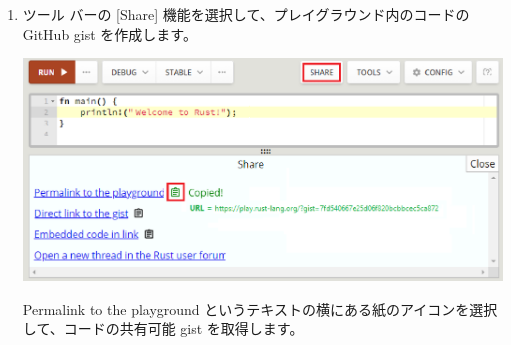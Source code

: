 \begin{enumerate}
\item ツール バーの [Share] 機能を選択して、プレイグラウンド内のコードの GitHub gist を作成します。

\includegraphics[width=14cm]{rust-playground-share.eps}

\item [Permalink to the playground] というテキストの横にある紙のアイコンを選択して、コードの共有可能 gist を取得します。
\end{enumerate}






